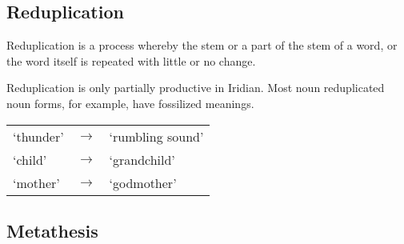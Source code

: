 \subsection{Reduplication}
\par Reduplication is a process whereby the stem or a part of the stem of a word, or the word itself is repeated with little or no change. 
\par Reduplication is only partially productive in Iridian. Most noun reduplicated noun forms, for example, have fossilized meanings.
	\begin{center}
	\begin{tabu}to 0.9\textwidth{YM[0.1]Y}
		 `thunder'&$\rightarrow$& `rumbling sound'\\
		 `child'&$\rightarrow$& `grandchild'\\
		 `mother'&$\rightarrow$& `godmother'\\
	\end{tabu}
\end{center}

\subsection{Metathesis}

